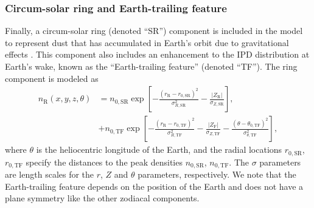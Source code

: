 \documentclass[twocolumn]{aa}
\begin{document}
\subsubsection{Circum-solar ring and Earth-trailing feature}
\label{sec:ring}
Finally, a circum-solar ring (denoted ``SR'') component is included in the
model to represent dust that has accumulated in Earth's orbit due to
gravitational effects \citep{Dermott1994}. This component also
includes an enhancement to the IPD distribution at Earth's wake, known
as the ``Earth-trailing feature'' (denoted ``TF''). The ring component is modeled as
\begin{align}
    n_\mathrm{R}(x, y, z, \theta)&=n_{0, \mathrm{SR}} \exp \left[-\frac{\left(r_\mathrm{R}-r_{0, \mathrm{SR}}\right)^2}{\sigma_{R,\mathrm{SR}} ^2}-\frac{\left| Z_\mathrm{R} \right|}{\sigma_{Z, \mathrm{SR}}}\right],\\
   &+ n_{0, \mathrm{TF}} \exp \left[-\frac{\left(r_\mathrm{R}-r_{0,
          \mathrm{TF}}\right)^{2}}{\sigma_{R,
          \mathrm{TF}}^{2}}-\frac{\left|Z_\mathrm{F}\right|}{\sigma_{Z,
          \mathrm{TF}}}-\frac{\left(\theta-\theta_{0,
          \mathrm{TF}}\right)^{2}}{\sigma_{\theta,\mathrm{TF}}^{2}}\right],
    \label{eq:ring}
\end{align}
where $\theta$ is the heliocentric longitude of the Earth, and the 
radial locations $r_{0, \mathrm{SR}}$, $r_{0, \mathrm{TF}}$ specify
the distances to the peak densities $n_{0, \mathrm{SR}}$, 
$n_{0, \mathrm{TF}}$. The $\sigma$ parameters are length scales for the 
$r$, $Z$ and $\theta$ parameters, respectively. We note that the 
Earth-trailing feature depends on the position of the Earth and does not 
have a plane symmetry like the other zodiacal components. 
\end{document}
